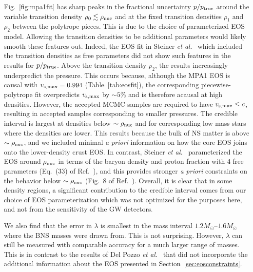 \documentclass[twocolumn,prd,amssymb,aps,nofootinbib,showpacs,epsf]{revtex4}
\begin{document}
Fig.~\ref{fig:mpa1fit} has sharp peaks in the fractional uncertainty $p/p_{\rm true}$ around the variable transition density $\rho_0 \lesssim \rho_{\rm nuc}$ and at the fixed transition densities $\rho_1$ and $\rho_2$ between the polytrope pieces. This is due to the choice of parameterized EOS model. Allowing the transition densities to be additional parameters would likely smooth these features out. Indeed, the EOS fit in Steiner {\it et al.}~\cite{SteinerLattimerBrown2010} which included the transition densities as free parameters did not show such features in the results for $p/p_{\rm true}$. Above the transition density $\rho_2$, the results increasingly underpredict the pressure. This occurs because, although the MPA1 EOS is causal with $v_{\rm s,max}=0.994$ (Table~\ref{tab:eosfit}), the corresponding piecewise-polytrope fit overpredicts $v_{\rm s,max}$ by $\sim 5\%$ and is therefore acausal at high densities. However, the accepted MCMC samples are required to have $v_{\rm s,max} \leq c$, resulting in accepted samples corresponding to smaller pressures. The credible interval is largest at densities below $\sim \rho_{\rm nuc}$ and for corresponding low mass stars where the densities are lower. This results because the bulk of NS matter is above $\sim \rho_{\rm nuc}$, and we included minimal {\it a priori} information on how the core EOS joins onto the lower-density crust EOS. In contrast, Steiner {\it et al.}~\cite{SteinerLattimerBrown2010} parameterized the EOS around $\rho_{\rm nuc}$ in terms of the baryon density and proton fraction with 4 free parameters (Eq.~(33) of Ref.~\cite{SteinerLattimerBrown2010}), and this provides stronger {\it a priori} constraints on the behavior below $\sim \rho_{\rm nuc}$ (Fig.~8 of Ref.~\cite{SteinerLattimerBrown2010}). Overall, it is clear that in some density regions, a significant contribution to the credible interval comes from our choice of EOS parameterization which was not optimized for the purposes here, and not from the sensitivity of the GW detectors. 

We also find that the error in $\lambda$ is smallest in the mass interval $1.2M_\odot$--$1.6M_\odot$ where the BNS masses were drawn from. This is not surprising. However, $\lambda$ can still be measured with comparable accuracy for a much larger range of masses. This is in contrast to the results of Del Pozzo {\it et al.}~\cite{DelPozzoLiAgathos2013} that did not incorporate the additional information about the EOS presented in Section~\ref{sec:eosconstraints}.
\end{document}
